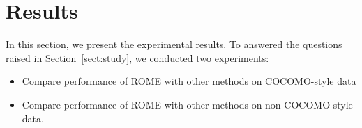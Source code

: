 \documentclass[sigconf,review,anonymous]{acmart}
\newcommand{\quart}[4]{
\begin{picture}(100,6)%
    {
        \color{black}
        \put(#3,3)
        {\circle*{4}}
        \put(#1,3)
        {\line(1,0){#2}}
    }
\end{picture}
}
\newcommand{\ofr} {
{\textit{out-of-range}}
}
\newcommand{\bi}{\begin{itemize}}
\newcommand{\ei}{\end{itemize}}
\begin{document}






\section{Results}

In this section, we present the experimental results. To answered the questions raised in Section~\ref{sect:study}, we conducted two experiments:
\bi
\item Compare performance of ROME with other methods on COCOMO-style data
\item Compare performance of ROME with other methods on non COCOMO-style data.
\ei 
\end{document}
